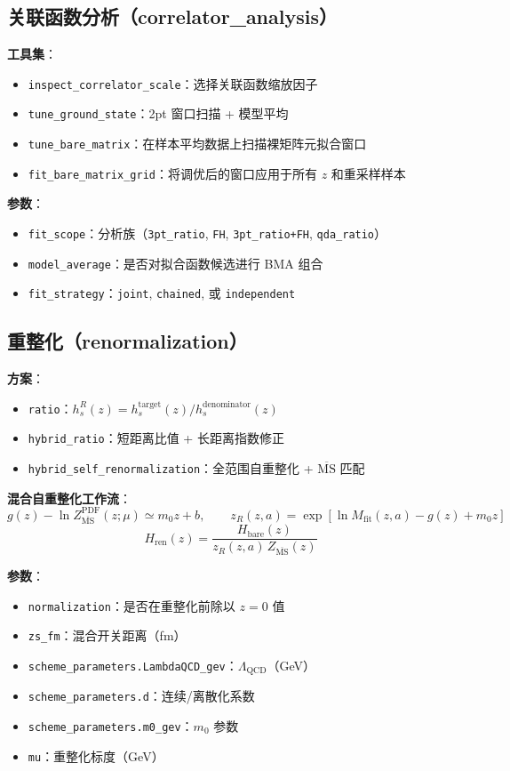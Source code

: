 \documentclass[12pt,a4paper]{ctexart}
\begin{document}
\subsection{关联函数分析（correlator\_analysis）}

\textbf{工具集}：
\begin{itemize}[itemsep=3pt]
    \item \texttt{inspect\_correlator\_scale}：选择关联函数缩放因子
    \item \texttt{tune\_ground\_state}：2pt 窗口扫描 + 模型平均
    \item \texttt{tune\_bare\_matrix}：在样本平均数据上扫描裸矩阵元拟合窗口
    \item \texttt{fit\_bare\_matrix\_grid}：将调优后的窗口应用于所有 $z$ 和重采样样本
\end{itemize}

\textbf{参数}：
\begin{itemize}[itemsep=2pt]
    \item \texttt{fit\_scope}：分析族（\texttt{3pt\_ratio}, \texttt{FH}, \texttt{3pt\_ratio+FH}, \texttt{qda\_ratio}）
    \item \texttt{model\_average}：是否对拟合函数候选进行 BMA 组合
    \item \texttt{fit\_strategy}：\texttt{joint}, \texttt{chained}, 或 \texttt{independent}
\end{itemize}

\subsection{重整化（renormalization）}

\textbf{方案}：
\begin{itemize}[itemsep=3pt]
    \item \texttt{ratio}：$h_s^R(z) = h_s^{\text{target}}(z) / h_s^{\text{denominator}}(z)$
    \item \texttt{hybrid\_ratio}：短距离比值 + 长距离指数修正
    \item \texttt{hybrid\_self\_renormalization}：全范围自重整化 + $\overline{\text{MS}}$ 匹配
\end{itemize}

\textbf{混合自重整化工作流}：
\[
g(z)-\ln Z_{\overline{\mathrm{MS}}}^{\mathrm{PDF}}(z;\mu)\simeq m_0z+b,
\qquad
z_R(z,a)=\exp[\ln M_{\mathrm{fit}}(z,a)-g(z)+m_0z]
\]
\[
H_{\mathrm{ren}}(z) = \frac{H_{\mathrm{bare}}(z)}{z_R(z,a)\,Z_{\overline{\mathrm{MS}}}(z)}
\]

\textbf{参数}：
\begin{itemize}[itemsep=2pt]
    \item \texttt{normalization}：是否在重整化前除以 $z=0$ 值
    \item \texttt{zs\_fm}：混合开关距离（fm）
    \item \texttt{scheme\_parameters.LambdaQCD\_gev}：$\Lambda_{\mathrm{QCD}}$（GeV）
    \item \texttt{scheme\_parameters.d}：连续/离散化系数
    \item \texttt{scheme\_parameters.m0\_gev}：$m_0$ 参数
    \item \texttt{mu}：重整化标度（GeV）
\end{itemize}
\end{document}
